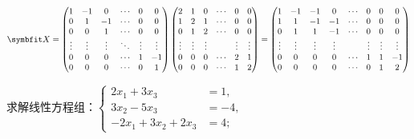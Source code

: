 \begin{solution}
    \[\bv{X}=\begin{pmatrix}1&-1&0&\cdots&0&0\\0&1&-1&\cdots&0&0\\0&0&1&\cdots&0&0\\\vdots&\vdots&\vdots&\ddots&\vdots&\vdots\\0&0&0&\cdots&1&-1\\0&0&0&\cdots&0&1\end{pmatrix}\begin{pmatrix}2&1&0&\cdots&0&0\\1&2&1&\cdots&0&0\\0&1&2&\cdots&0&0\\\vdots&\vdots&\vdots&&\vdots&\vdots\\0&0&0&\cdots&2&1\\0&0&0&\cdots&1&2\end{pmatrix}=\begin{pmatrix}1&-1&-1&0&\cdots&0&0&0\\1&1&-1&-1&\cdots&0&0&0\\0&1&1&-1&\cdots&0&0&0\\\vdots&\vdots&\vdots&\vdots&&\vdots&\vdots&\vdots\\0&0&0&0&\cdots&1&1&-1\\0&0&0&0&\cdots&0&1&2\end{pmatrix}\]
\end{solution}
\newpage
\begin{example}{}{}
    求解线性方程组：$\left\{\begin{aligned}2x_1+3x_3&=1,\\3x_2-5x_3&=-4,\\-2x_1+3x_2+2x_3&=4;\end{aligned}\right.$
\end{example}
